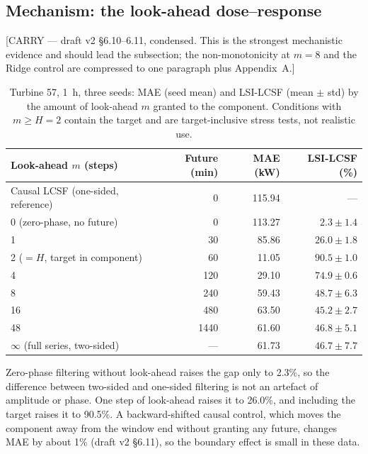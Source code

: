 \documentclass[review,3p,times]{elsarticle}
\newcommand{\carry}[1]{\textsf{\small [CARRY --- #1]}}
\begin{document}
\subsection{Mechanism: the look-ahead dose--response}\label{sec:mechanism}
\carry{draft v2 §6.10--6.11, condensed. This is the strongest mechanistic
evidence and should lead the subsection; the non-monotonicity at $m=8$ and the
Ridge control are compressed to one paragraph plus Appendix~A.}

\begin{table}[htbp]\centering
\caption{Turbine 57, 1~h, three seeds: MAE (seed mean) and LSI-LCSF
(mean $\pm$ std) by the amount of look-ahead $m$ granted to the component.
Conditions with $m\ge H=2$ contain the target and are target-inclusive stress
tests, not realistic use.}
\label{tab:dose}
\footnotesize
\begin{tabular}{lrrr}
\toprule
Look-ahead $m$ (steps) & Future (min) & MAE (kW) & LSI-LCSF (\%) \\
\midrule
Causal LCSF (one-sided, reference) & 0 & 115.94 & --- \\
0 (zero-phase, no future)          & 0 & 113.27 & $2.3\pm1.4$ \\
1                                  & 30 & 85.86 & $26.0\pm1.8$ \\
2 ($=H$, target in component)      & 60 & 11.05 & $90.5\pm1.0$ \\
4                                  & 120 & 29.10 & $74.9\pm0.6$ \\
8                                  & 240 & 59.43 & $48.7\pm6.3$ \\
16                                 & 480 & 63.50 & $45.2\pm2.7$ \\
48                                 & 1440 & 61.60 & $46.8\pm5.1$ \\
$\infty$ (full series, two-sided)  & --- & 61.73 & $46.7\pm7.7$ \\
\bottomrule
\end{tabular}
\end{table}

Zero-phase filtering without look-ahead raises the gap only to 2.3\%, so the
difference between two-sided and one-sided filtering is not an artefact of
amplitude or phase. One step of look-ahead raises it to 26.0\%, and including
the target raises it to 90.5\%. A backward-shifted causal control, which moves
the component away from the window end without granting any future, changes MAE
by about 1\% (draft v2 §6.11), so the boundary effect is small in these data.
\end{document}
